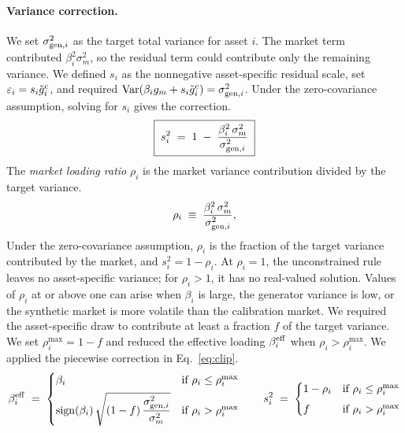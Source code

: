 \paragraph{Variance correction.}

We set $\sigma_{\mathrm{gen},i}^2$ as the target total variance for asset $i$.
The market term contributed $\beta_i^2\sigma_m^2$, so the residual term
could contribute only the remaining variance. We defined $s_i$ as the
nonnegative asset-specific residual scale, set
$\varepsilon_i=s_i\tilde{g}_i^{\mathrm c}$, and required
$\operatorname{Var}(\beta_i g_m+s_i\tilde{g}_i^{\mathrm c})=\sigma_{\mathrm{gen},i}^2$. Under the
zero-covariance assumption, solving for $s_i$ gives the correction.
\begin{equation}
  \boxed{\;s_i^2 \;=\; 1 \;-\; \frac{\beta_i^2\, \sigma_m^2}{\sigma_{\mathrm{gen},i}^2}\;}
  \label{eq:scale}
\end{equation}
The \emph{market loading ratio} $\rho_i$ is the market variance
contribution divided by the target variance.
\begin{equation}
  \rho_i \;\equiv\; \frac{\beta_i^2\, \sigma_m^2}{\sigma_{\mathrm{gen},i}^2},
  \label{eq:rho}
\end{equation}
Under the zero-covariance assumption, $\rho_i$ is the fraction of the
target variance contributed by the market, and $s_i^2=1-\rho_i$. At
$\rho_i=1$, the unconstrained rule leaves no asset-specific variance;
for $\rho_i>1$, it has no real-valued solution. Values of $\rho_i$ at or
above one can arise when $\beta_i$ is large, the generator variance is low, or the
synthetic market is more volatile than the calibration market. We
required the asset-specific draw to contribute at least a fraction $f$
of the target variance. We set $\rho_i^{\max}=1-f$ and reduced the
effective loading $\beta_i^{\mathrm{eff}}$ when $\rho_i>\rho_i^{\max}$. We
applied the piecewise correction in Eq.~\eqref{eq:clip}.
\begin{equation}
  \beta_i^{\mathrm{eff}} \;=\;
  \begin{cases}
    \beta_i & \text{if } \rho_i \le \rho_i^{\max} \\[4pt]
    \operatorname{sign}(\beta_i)\,\sqrt{(1 - f)\,\dfrac{\sigma_{\mathrm{gen},i}^2}{\sigma_m^2}} & \text{if } \rho_i > \rho_i^{\max}
  \end{cases}
  \qquad
  s_i^2 \;=\;
  \begin{cases}
    1 - \rho_i & \text{if } \rho_i \le \rho_i^{\max} \\[4pt]
    f          & \text{if } \rho_i > \rho_i^{\max}
  \end{cases}
  \label{eq:clip}
\end{equation}
